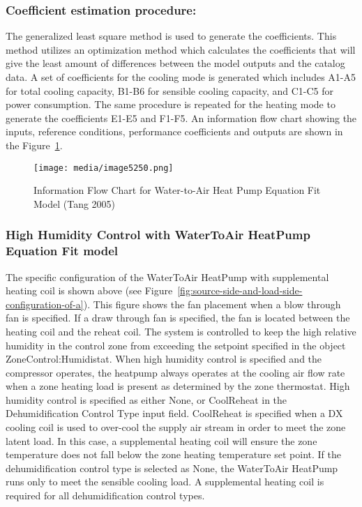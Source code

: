 \subsubsection{Coefficient estimation procedure:}\label{coefficient-estimation-procedure}

The generalized least square method is used to generate the coefficients. This method utilizes an optimization method which calculates the coefficients that will give the least amount of differences between the model outputs and the catalog data. A set of coefficients for the cooling mode is generated which includes A1-A5 for total cooling capacity, B1-B6 for sensible cooling capacity, and C1-C5 for power consumption. The same procedure is repeated for the heating mode to generate the coefficients E1-E5 and F1-F5. An information flow chart showing the inputs, reference conditions, performance coefficients and outputs are shown in the Figure~\ref{fig:information-flow-chart-for-water-to-air-heat}.

\begin{figure}[hbtp] %
\centering
\texttt{[image: media/image5250.png]}
\caption{Information Flow Chart for Water-to-Air Heat Pump Equation Fit Model (Tang 2005) \protect \label{fig:information-flow-chart-for-water-to-air-heat}}
\end{figure}

\subsubsection{High Humidity Control with WaterToAir HeatPump Equation Fit model}\label{high-humidity-control-with-watertoair-heatpump-equation-fit-model}

The specific configuration of the WaterToAir HeatPump with supplemental heating coil is shown above (see Figure~\ref{fig:source-side-and-load-side-configuration-of-a}). This figure shows the fan placement when a blow through fan is specified. If a draw through fan is specified, the fan is located between the heating coil and the reheat coil. The system is controlled to keep the high relative humidity in the control zone from exceeding the setpoint specified in the object ZoneControl:Humidistat. When high humidity control is specified and the compressor operates, the heatpump always operates at the cooling air flow rate when a zone heating load is present as determined by the zone thermostat. High humidity control is specified as either None, or CoolReheat in the Dehumidification Control Type input field. CoolReheat is specified when a DX cooling coil is used to over-cool the supply air stream in order to meet the zone latent load. In this case, a supplemental heating coil will ensure the zone temperature does not fall below the zone heating temperature set point. If the dehumidification control type is selected as None, the WaterToAir HeatPump runs only to meet the sensible cooling load. A supplemental heating coil is required for all dehumidification control types.

